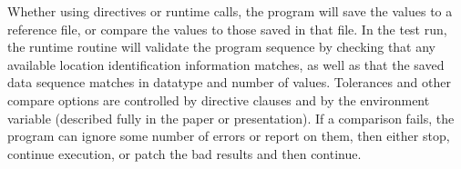 Whether using directives or runtime calls, the program will save the values to a reference file, or compare the values to those saved in that file.
In the test run, the runtime routine will validate the program sequence by checking that any available location identification information matches, as well as that the saved data sequence matches in datatype and number of values.
Tolerances and other compare options are controlled by directive clauses and by the  environment variable (described fully in the paper or presentation).
If a comparison fails, the program can ignore some number of errors or report on them, then either stop, continue execution, or patch the bad results and then continue.
